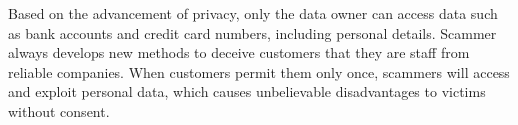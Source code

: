 \documentclass[12pt,a4paper]{article}
\begin{document}
Based on the advancement of privacy, only the data owner can access data such as bank accounts and credit card numbers, including personal details. Scammer always develops new methods to deceive customers that they are staff from reliable companies. When customers permit them only once, scammers will access and exploit personal data, which causes unbelievable disadvantages to victims without consent.

\pagebreak





	
\def\UrlBreaks{\do\/\do-}

\clearpage
\end{document}

